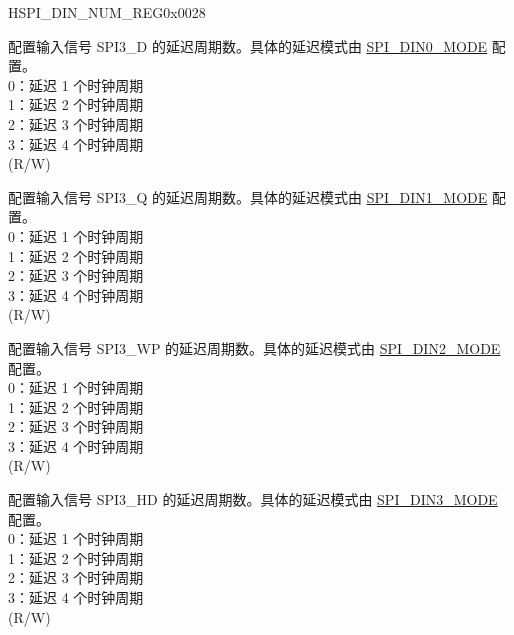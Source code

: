 \begin{register}{H}{SPI\_DIN\_NUM\_REG}{0x0028}\label{regdesc:SPI3DINNUMREG}
%
%
%
%
%
\regnewline%
\begin{regdesc}\begin{reglist}
\label{fielddesc:SPI3DIN0NUM}\item [SPI\_DIN0\_NUM] 配置输入信号 SPI3\_D 的延迟周期数。具体的延迟模式由 \hyperref[fielddesc:SPI3DIN0MODE]{SPI\_DIN0\_MODE} 配置。\\
0：延迟 1 个时钟周期\\
1：延迟 2 个时钟周期\\
2：延迟 3 个时钟周期\\
3：延迟 4 个时钟周期\\

(R/W)
\label{fielddesc:SPI3DIN1NUM}\item [SPI\_DIN1\_NUM] 配置输入信号 SPI3\_Q 的延迟周期数。具体的延迟模式由 \hyperref[fielddesc:SPI3DIN1MODE]{SPI\_DIN1\_MODE} 配置。\\
0：延迟 1 个时钟周期\\
1：延迟 2 个时钟周期\\
2：延迟 3 个时钟周期\\
3：延迟 4 个时钟周期\\

(R/W)
\label{fielddesc:SPI3DIN2NUM}\item [SPI\_DIN2\_NUM] 配置输入信号 SPI3\_WP 的延迟周期数。具体的延迟模式由 \hyperref[fielddesc:SPI3DIN2MODE]{SPI\_DIN2\_MODE} 配置。\\
0：延迟 1 个时钟周期\\
1：延迟 2 个时钟周期\\
2：延迟 3 个时钟周期\\
3：延迟 4 个时钟周期\\

(R/W)
\label{fielddesc:SPI3DIN3NUM}\item [SPI\_DIN3\_NUM] 配置输入信号 SPI3\_HD 的延迟周期数。具体的延迟模式由 \hyperref[fielddesc:SPI3DIN3MODE]{SPI\_DIN3\_MODE} 配置。\\
0：延迟 1 个时钟周期\\
1：延迟 2 个时钟周期\\
2：延迟 3 个时钟周期\\
3：延迟 4 个时钟周期\\

(R/W)
\end{reglist}\end{regdesc}
\end{register}


